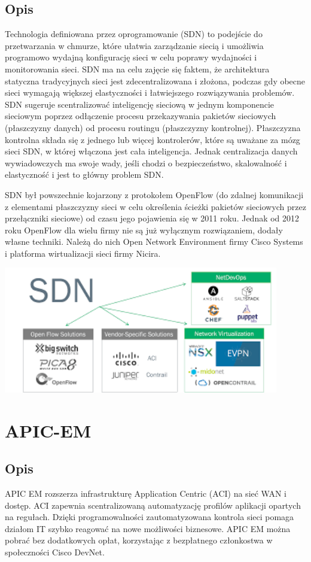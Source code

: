 \documentclass{article}
\begin{document}
\subsection{Opis}
	Technologia definiowana przez oprogramowanie (SDN) to podejście do przetwarzania w chmurze, które ułatwia zarządzanie siecią i umożliwia programowo wydajną konfigurację sieci w celu poprawy wydajności i monitorowania sieci.  SDN ma na celu zajęcie się faktem, że architektura statyczna tradycyjnych sieci jest zdecentralizowana i złożona, podczas gdy obecne sieci wymagają większej elastyczności i łatwiejszego rozwiązywania problemów. SDN sugeruje scentralizować inteligencję sieciową w jednym komponencie sieciowym poprzez odłączenie procesu przekazywania pakietów sieciowych (płaszczyzny danych) od procesu routingu (płaszczyzny kontrolnej). Płaszczyzna kontrolna składa się z jednego lub więcej kontrolerów, które są uważane za mózg sieci SDN, w której włączona jest cała inteligencja. Jednak centralizacja danych wywiadowczych ma swoje wady, jeśli chodzi o bezpieczeństwo,  skalowalność i elastyczność  i jest to główny problem SDN.

SDN był powszechnie kojarzony z protokołem OpenFlow (do zdalnej komunikacji z elementami płaszczyzny sieci w celu określenia ścieżki pakietów sieciowych przez przełączniki sieciowe) od czasu jego pojawienia się w 2011 roku. Jednak od 2012 roku  OpenFlow dla wielu firmy nie są już wyłącznym rozwiązaniem, dodały własne techniki. Należą do nich Open Network Environment firmy Cisco Systems i platforma wirtualizacji sieci firmy Nicira.

\includegraphics[width=0.9\textwidth]{sdn.png}
 \newpage
\section{APIC-EM}
\subsection{Opis}
	APIC EM rozszerza infrastrukturę Application Centric (ACI) na sieć WAN i dostęp. ACI zapewnia scentralizowaną automatyzację profilów aplikacji opartych na regułach. Dzięki programowalności zautomatyzowana kontrola sieci pomaga działom IT szybko reagować na nowe możliwości biznesowe. APIC EM można pobrać bez dodatkowych opłat, korzystając z bezpłatnego członkostwa w społeczności Cisco DevNet.
\end{document}
